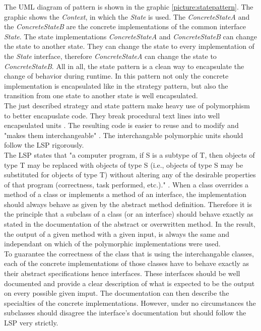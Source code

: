 The \ac{UML} diagram of pattern is shown in the graphic \ref{picture:statepattern}. The graphic shows the \textit{Context}, in which the \textit{State} is used. The \textit{ConcreteStateA} and the \textit{ConcreteStateB} are the concrete implementations of the common interface \textit{State}. The state implementations  \textit{ConcreteStateA} and \textit{ConcreteStateB} can change the state to another state. They can change the state to every implementation of the \textit{State} interface, therefore \textit{ConcreteStateA} can change the state to \textit{ConcreteStateB}.
All in all, the state pattern is a clean way to encapsulate the change of behavior during runtime. In this pattern not only the concrete implementation is encapsulated like in the strategy pattern, but also the transition from one state to another state is well encapsulated. 
\\

The just described strategy and state pattern make heavy use of polymorphism to better encapuslate code. They break procedural text lines into well encapsulated units \cite[p. 349]{gof}. The resulting code is easier to reuse and to modify and "makes them interchangeable" \cite[p. 21]{gof}. The interchangable polymorphic units should follow the \ac{LSP} rigorously.
\\

The \ac{LSP} states that "a computer program, if S is a subtype of T, then objects of type T may be replaced with objects of type S (i.e., objects of type S may be substituted for objects of type T) without altering any of the desirable properties of that program (correctness, task performed, etc.)." \cite[Liskov Substitution Principle]{wiki}. When a class overrides a method of a class or implements a method of an interface, the implementation should always behave as given by the abstract method definition. Therefore it is the principle that a subclass of a class (or an interface) should behave exactly as stated in the documentation of the abstract or overwritten method. In the result, the output of a given method with a given input, is always the same and independant on which of the polymorphic implementations were used. 
\\

 To guarantee the correctness of the class that is using the interchangable classes, each of the concrete implementations of those classes have to behave exactly as their abstract specifications hence interfaces. These interfaces should be well documented and provide a clear description of what is expected to be the output on every possible given imput. The documentation can then describe the specialties of the concrete implementations. However, under no circumstances the subclasses should disagree the interface's documentation but should follow the \ac{LSP} very strictly. 
 \\

